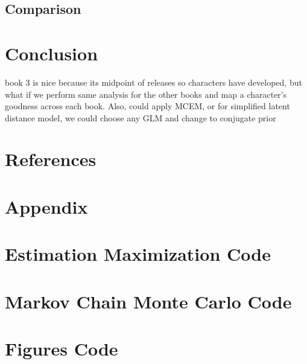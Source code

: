 \documentclass{article}
\begin{document}
\subsection{Comparison}

\section{Conclusion} \label{Conclusion}

book 3 is nice because its midpoint of releases so characters have developed, but what if we perform same analysis for the other books and map a character's goodness across each book. Also, could apply MCEM, or for simplified latent distance model, we could choose any GLM and change to conjugate prior

\section{References}
\printbibliography

\section*{Appendix}
\appendix 

\section{Estimation Maximization Code}
\section{Markov Chain Monte Carlo Code}
\section{Figures Code}
\end{document}
